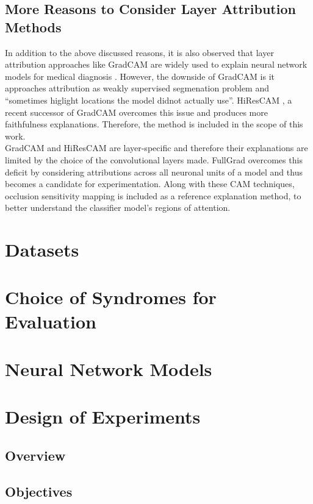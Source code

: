 \documentclass[../report.tex]{subfiles}
\begin{document}
    \subsection{More Reasons to Consider Layer Attribution Methods}
    In addition to the above discussed reasons, it is also observed that layer attribution approaches like GradCAM are widely used to explain neural network models for medical diagnosis \cite{} \cite{} \cite{}. However, the downside of GradCAM is it approaches
    attribution as weakly supervised segmenation problem and \enquote{sometimes higlight locations the model didnot actually use}\cite{draelos2020hirescam}. HiResCAM \cite{draelos2020hirescam}, a recent successor of GradCAM overcomes this issue and produces more faithfulness explanations. Therefore, the method is included in the scope of this work.\\
    GradCAM and HiResCAM are layer-specific and therefore their explanations are limited by the choice of the convolutional layers made. FullGrad overcomes this deficit by considering attributions across all neuronal units of a model and thus becomes a candidate for experimentation. Along with these CAM techniques, occlusion sensitivity mapping is included as a reference explanation method, to better understand the classifier model's regions of attention.
    	  
    
    \section{Datasets}
    
    \section{Choice of Syndromes for Evaluation}
    \section{Neural Network Models}
    \section{Design of Experiments}
    \subsection{Overview}
    \subsection{Objectives}
\end{document}
